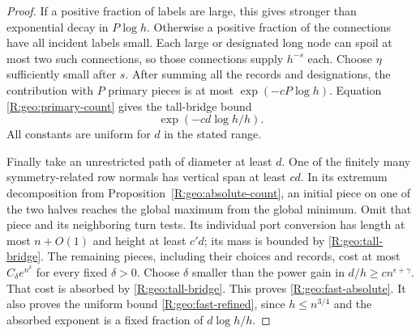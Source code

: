 \begin{proof}
If a positive fraction of labels are large, this gives stronger than
exponential decay in $P\log h$.  Otherwise a positive fraction of the
connections have all incident labels small.  Each large or designated
long node can spoil at most two such connections, so those connections
supply $h^{-s}$ each.  Choose $\eta$ sufficiently small after $s$.
After summing all the records and designations, the contribution with
$P$ primary pieces is at most $\exp(-cP\log h)$.  Equation
\eqref{R:geo:primary-count} gives the tall-bridge bound
\begin{equation}\label{R:geo:tall-bridge}
                  \exp(-c d\log h/h).
\end{equation}
All constants are uniform for $d$ in the stated range.

Finally take an unrestricted path of diameter at least $d$.  One of the
finitely many symmetry-related row normals has vertical span at least
$c d$.  In its extremum decomposition from
Proposition~\ref{R:geo:absolute-count}, an initial piece on one of
the two halves reaches the global maximum from the global minimum.
Omit that piece and its neighboring turn tests.  Its individual port
conversion has length at most $n+O(1)$ and height at least $c'd$;
its mass is bounded by \eqref{R:geo:tall-bridge}.  The remaining
pieces, including their choices and records, cost at most
$C_\delta e^{n^\delta}$ for every fixed $\delta>0$.
Choose $\delta$ smaller than the power gain in
$d/h\ge c n^{\epsilon+\gamma}$.  That cost is absorbed by
\eqref{R:geo:tall-bridge}.  This proves
\eqref{R:geo:fast-absolute}.  It also proves the uniform bound
\eqref{R:geo:fast-refined}, since $h\le n^{3/4}$ and the absorbed
exponent is a fixed fraction of $d\log h/h$.
\end{proof}
